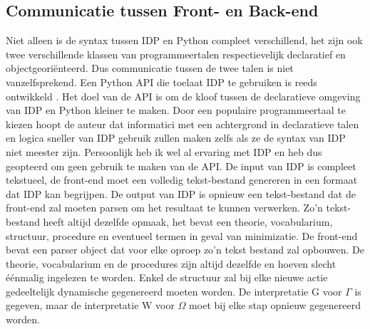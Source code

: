\subsection{Communicatie tussen Front- en Back-end}
Niet alleen is de syntax tussen IDP en Python compleet verschillend, het zijn ook twee verschillende klassen van programmeertalen respectievelijk declaratief en objectgeori\"{e}nteerd. Dus communicatie tussen de twee talen is niet vanzelfsprekend. Een Python API die toelaat IDP te gebruiken is reeds ontwikkeld \citep{vennekens2015lowering}. Het doel van de API is om de kloof tussen de declaratieve omgeving van IDP en Python kleiner te maken. Door een populaire programmeertaal te kiezen hoopt de auteur dat informatici met een achtergrond in declaratieve talen en logica sneller van IDP gebruik zullen maken zelfs als ze de syntax van IDP niet meester zijn. Persoonlijk heb ik wel al ervaring met IDP en heb dus geopteerd om geen gebruik te maken van de API. De input van IDP is compleet tekstueel, de front-end moet een volledig tekst-bestand genereren in een formaat dat IDP kan begrijpen. De output van IDP is opnieuw een tekst-bestand dat de front-end zal moeten parsen om het resultaat te kunnen verwerken. Zo'n tekst-bestand heeft altijd dezelfde opmaak, het bevat een theorie, vocabularium, structuur, procedure en eventueel termen in geval van minimizatie. De front-end bevat een parser object dat voor elke oproep zo'n tekst bestand zal opbouwen. De theorie, vocabularium en de procedures zijn altijd dezelfde en hoeven slecht \'{e}\'{e}nmalig ingelezen te worden. Enkel de structuur zal bij elke nieuwe actie gedeeltelijk dynamische gegenereerd moeten worden. De interpretatie G voor $\Gamma$ is gegeven, maar de interpretatie W voor $\Omega$ moet bij elke stap opnieuw gegenereerd worden.